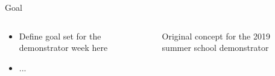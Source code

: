 \documentclass[
xcolor=dvipsnames,
aspectratio=169,
9pt,
]{beamer}
\begin{document}
\begin{frame}{Goal}
	\begin{columns}
		\begin{column}{0.4\textwidth}
			\begin{itemize}
				\item Define goal set for the demonstrator week here
				\item ...
			\end{itemize}
		\end{column}
		\begin{column}{0.6\textwidth}
			\begin{center}
				\begin{figure}
					\caption{Original concept for the 2019 summer school demonstrator}
				\end{figure}
			\end{center}
		\end{column}
	\end{columns}
\end{frame}
\end{document}
